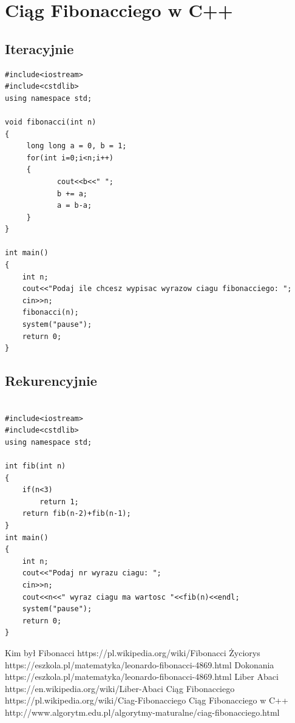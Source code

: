 \documentclass{report}
\begin{document}
\section{Ciąg Fibonacciego w C++}
\subsection{Iteracyjnie}
\cite{fib6}
\begin{lstlisting}
#include<iostream>
#include<cstdlib>
using namespace std;

void fibonacci(int n)
{    
     long long a = 0, b = 1;
     for(int i=0;i<n;i++)
     {
            cout<<b<<" ";
            b += a;  
            a = b-a;  
     }     
}

int main()
{
    int n;
    cout<<"Podaj ile chcesz wypisac wyrazow ciagu fibonacciego: ";
    cin>>n;
    fibonacci(n);
    system("pause");
    return 0;
}
\end{lstlisting}
\newpage
\subsection{Rekurencyjnie}
\cite{fib6}
\begin{lstlisting}

#include<iostream>
#include<cstdlib>
using namespace std;

int fib(int n)
{
	if(n<3)
		return 1;
	return fib(n-2)+fib(n-1);
}
int main()
{
	int n;
	cout<<"Podaj nr wyrazu ciagu: ";
	cin>>n;
	cout<<n<<" wyraz ciagu ma wartosc "<<fib(n)<<endl;
	system("pause");
	return 0;
}
\end{lstlisting}
\newpage
\begin{thebibliography}{9}
 Kim był Fibonacci https://pl.wikipedia.org/wiki/Fibonacci
 Życiorys https://eszkola.pl/matematyka/leonardo-fibonacci-4869.html
 Dokonania https://eszkola.pl/matematyka/leonardo-fibonacci-4869.html
 Liber Abaci https://en.wikipedia.org/wiki/Liber-Abaci
 Ciąg Fibonacciego https://pl.wikipedia.org/wiki/Ciag-Fibonacciego
 Ciąg Fibonacciego w C++ http://www.algorytm.edu.pl/algorytmy-maturalne/ciag-fibonacciego.html
\end{thebibliography}
\listoffigures
\end{document}
